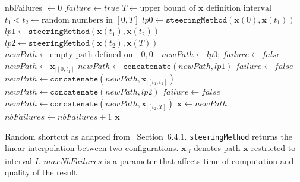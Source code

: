 \documentclass{tADR2e}
\newcommand\xx{\mathbf{x}}
\begin{document}
\begin{algorithm}
\begin{algorithmic}[1] %
\Procedure{randomShortcut}{$\xx$}
   \State nbFailures $\gets 0$
        \State $failure \gets true$
        \State $T \gets \mbox{upper bound of }\xx\mbox{ definition interval}$
        \State $t_1 < t_2 \gets \mbox{random numbers in }[0,T]$
        \State $lp0 \gets \texttt{steeringMethod} (\xx(0), \xx(t_1))$
        \State $lp1 \gets \texttt{steeringMethod} (\xx(t_1), \xx(t_2))$
        \State $lp2 \gets \texttt{steeringMethod} (\xx(t_2), \xx(T))$
        \State $newPath \gets \mbox{empty path defined on }[0,0]$
          \State $newPath \gets lp0$; $failure \gets false$
        \Else
          \State $newPath \gets \xx_{|[0,t_1]}$
        \EndIf
          \State $newPath \gets \texttt{concatenate} (newPath, lp1)$
          \State $failure \gets false$
        \Else
          \State $newPath \gets \texttt{concatenate} (newPath, \xx_{|[t_1,t_2]})$
        \EndIf
          \State $newPath \gets \texttt{concatenate} (newPath, lp2)$
          \State $failure \gets false$
        \Else
          \State $newPath \gets \texttt{concatenate} (newPath, \xx_{|[t_2,T]})$
        \EndIf
        \State $\xx \gets newPath$
         $nbFailures \gets nbFailures + 1$
        \EndIf
      \EndWhile
    \Return $\xx$
\EndProcedure
\end{algorithmic}
\caption{Random shortcut as adapted from~\cite{Sekhavat-Svestka1998} 
Section~6.4.1. \texttt{steeringMethod} returns the linear interpolation between 
two configurations. $\xx_{|I}$ denotes path $\xx$ restricted to interval $I$. 
$maxNbFailures$ is a parameter that affects time of computation and quality of 
the result.}\label{algo:random-shortcut}
\end{algorithm}
\end{document}
